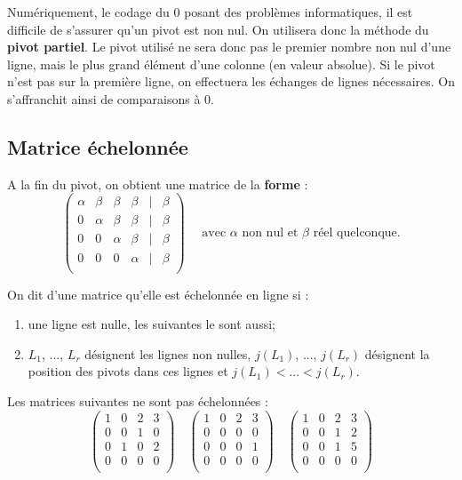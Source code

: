 \documentclass[10pt]{article}
\begin{document}
\begin{rem}
Numériquement, le codage du 0 posant des problèmes informatiques, il est difficile de s'assurer qu'un pivot est non nul. On utilisera donc la méthode du \textbf{pivot partiel}. Le pivot utilisé ne sera donc pas le premier nombre non nul d'une ligne, mais le plus grand élément d'une colonne (en valeur absolue). Si le pivot n'est pas sur la première ligne, on effectuera les échanges de lignes nécessaires. On s'affranchit ainsi de comparaisons à 0. 

\end{rem}
\subsection{Matrice échelonnée}
A la fin du pivot, on obtient une matrice de la \textbf{forme} :
$$
\begin{pmatrix}
\alpha &\beta & \beta & \beta &  | &\beta \\
0  & \alpha & \beta  &  \beta   &  | & \beta \\
0 & 0 &   \alpha& \beta &  | &\beta  \\
0 & 0 & 0 & \alpha &   | &\beta\\
\end{pmatrix}
\quad 
\text{ avec }\alpha \text{ non nul et }\beta \text{ réel quelconque.}
$$

\begin{defi}
On dit d'une matrice qu'elle est échelonnée en ligne si :
\begin{enumerate}
\item une ligne est nulle, les suivantes le sont aussi;
\item $L_1$, ..., $L_r$ désignent les lignes non nulles, $j(L_1)$, ..., $j(L_r)$ désignent la position des pivots dans ces lignes et $j(L_1)<...<j(L_r)$. 
\end{enumerate}
\end{defi}

\begin{exemple}
Les matrices suivantes ne sont pas échelonnées : 
$$
\begin{pmatrix}
1 & 0 & 2 & 3\\
0 & 0 & 1 & 0\\
0 & 1 & 0 & 2\\
0 & 0 & 0 & 0\\
\end{pmatrix}
\quad
\begin{pmatrix}
1 & 0 & 2 & 3\\
0 & 0 & 0 & 0\\
0 & 0 & 0 & 1\\
0 & 0 & 0 & 0\\
\end{pmatrix}
\quad
\begin{pmatrix}
1 & 0 & 2 & 3\\
0 & 0 & 1 & 2\\
0 & 0 & 1 & 5\\
0 & 0 & 0 & 0\\
\end{pmatrix}
$$
\end{exemple}
\end{document}
